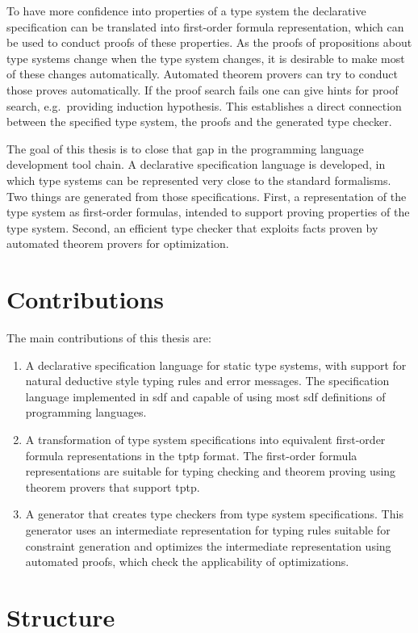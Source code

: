 To have more confidence into properties of a type system the
declarative specification can be translated into first-order formula
representation, which can be used to conduct proofs of these
properties. As the proofs of propositions about type systems change
when the type system changes, it is desirable to make most of these
changes automatically. Automated theorem provers can try to conduct
those proves automatically. If the proof search fails one can give
hints for proof search, e.g.\ providing induction hypothesis. This
establishes a direct connection between the specified type system, the
proofs and the generated type checker.

The goal of this thesis is to close that gap in the programming
language development tool chain. A declarative specification language
is developed, in which type systems can be represented very close to
the standard formalisms. Two things are generated from those
specifications. First, a representation of the type system as
first-order formulas, intended to support proving properties of the
type system. Second, an efficient type checker that exploits facts
proven by automated theorem provers for optimization.
\section{Contributions}
The main contributions of this thesis are:
\begin{enumerate}
\item A declarative specification language for static type systems,
  with support for natural deductive style typing rules and error
  messages. The specification language implemented in \gls{sdf} and
  capable of using most \gls{sdf} definitions of programming languages.
\item A transformation of type system specifications into equivalent
  first-order formula representations in the \gls{tptp} format. The
  first-order formula representations are suitable for typing checking
  and theorem proving using theorem provers that support \gls{tptp}.
\item A generator that creates type checkers from type system
  specifications. This generator uses an intermediate representation
  for typing rules suitable for constraint generation and optimizes
  the intermediate representation using automated proofs, which check
  the applicability of optimizations.
\end{enumerate}

\section{Structure}

